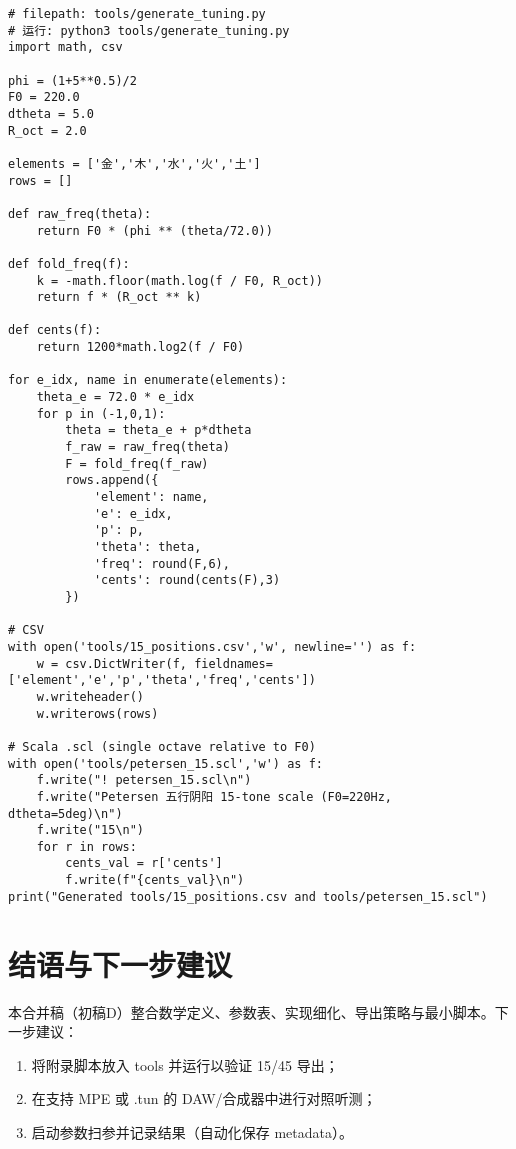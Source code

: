 \documentclass{article}
\begin{document}
\begin{verbatim}
# filepath: tools/generate_tuning.py
# 运行: python3 tools/generate_tuning.py
import math, csv

phi = (1+5**0.5)/2
F0 = 220.0
dtheta = 5.0
R_oct = 2.0

elements = ['金','木','水','火','土']
rows = []

def raw_freq(theta):
    return F0 * (phi ** (theta/72.0))

def fold_freq(f):
    k = -math.floor(math.log(f / F0, R_oct))
    return f * (R_oct ** k)

def cents(f):
    return 1200*math.log2(f / F0)

for e_idx, name in enumerate(elements):
    theta_e = 72.0 * e_idx
    for p in (-1,0,1):
        theta = theta_e + p*dtheta
        f_raw = raw_freq(theta)
        F = fold_freq(f_raw)
        rows.append({
            'element': name,
            'e': e_idx,
            'p': p,
            'theta': theta,
            'freq': round(F,6),
            'cents': round(cents(F),3)
        })

# CSV
with open('tools/15_positions.csv','w', newline='') as f:
    w = csv.DictWriter(f, fieldnames=['element','e','p','theta','freq','cents'])
    w.writeheader()
    w.writerows(rows)

# Scala .scl (single octave relative to F0)
with open('tools/petersen_15.scl','w') as f:
    f.write("! petersen_15.scl\n")
    f.write("Petersen 五行阴阳 15-tone scale (F0=220Hz, dtheta=5deg)\n")
    f.write("15\n")
    for r in rows:
        cents_val = r['cents']
        f.write(f"{cents_val}\n")
print("Generated tools/15_positions.csv and tools/petersen_15.scl")
\end{verbatim}

\section{结语与下一步建议}
本合并稿（初稿D）整合数学定义、参数表、实现细化、导出策略与最小脚本。下一步建议：
\begin{enumerate}
  \item 将附录脚本放入 tools 并运行以验证 15/45 导出；
  \item 在支持 MPE 或 .tun 的 DAW/合成器中进行对照听测；
  \item 启动参数扫参并记录结果（自动化保存 metadata）。
\end{enumerate}
\end{document}
